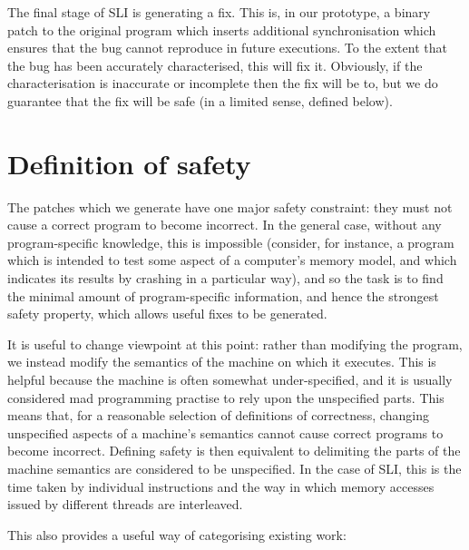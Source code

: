 \documentclass[10pt,a4paper,twocolumn]{article}
\begin{document}
The final stage of SLI is generating a fix.  This is, in our
prototype, a binary patch to the original program which inserts
additional synchronisation which ensures that the bug cannot reproduce
in future executions.
To the extent that the bug has been accurately
characterised, this will fix it.  Obviously, if the characterisation
is inaccurate or incomplete then the fix will be to, but we do
guarantee that the fix will be safe (in a limited sense, defined
below).

\section{Definition of safety}

The patches which we generate have one major safety constraint: they
must not cause a correct program to become incorrect.  In the general
case, without any program-specific knowledge, this is impossible
(consider, for instance, a program which is intended to test some
aspect of a computer's memory model, and which indicates its results
by crashing in a particular way), and so the task is to find the
minimal amount of program-specific information, and hence the
strongest safety property, which allows useful fixes to be generated.

It is useful to change viewpoint at this point: rather than modifying
the program, we instead modify the semantics of the machine on which
it executes.  This is helpful because the machine is often somewhat
under-specified, and it is usually considered mad programming practise
to rely upon the unspecified parts.  This means that, for a reasonable
selection of definitions of correctness, changing unspecified aspects
of a machine's semantics cannot cause correct programs to become
incorrect.  Defining safety is then equivalent to delimiting the parts
of the machine semantics are considered to be unspecified.  In the
case of SLI, this is the time taken by individual instructions and the
way in which memory accesses issued by different threads are
interleaved.

This also provides a useful way of categorising existing
work:
\end{document}

